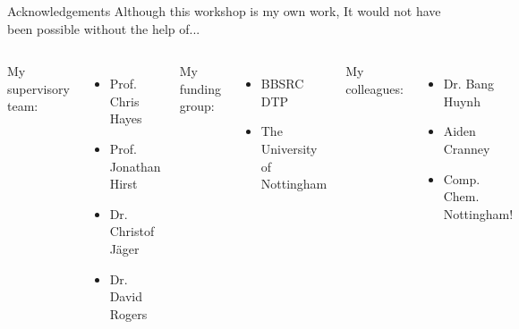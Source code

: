 \begin{frame}{Acknowledgements}
Although this workshop is my own work, It would not have been possible without the help of...
\newline
\begin{columns}
My supervisory team:
\begin{itemize}
\item Prof. Chris Hayes
\item Prof. Jonathan Hirst
\item Dr. Christof J\"{a}ger
\item Dr. David Rogers
\end{itemize}

My funding group:
\begin{itemize}
\item BBSRC DTP
\item The University of Nottingham
\end{itemize}

My colleagues:
\begin{itemize}
\item Dr. Bang Huynh
\item Aiden Cranney
\item Comp. Chem. Nottingham! 
\end{itemize}
\begin{multicols}{2}
\centering
\begin{figure}
\includegraphics[height=0.08\textheight]{../Graphics/UoN_gradient_logo_CMYK}
\end{figure}
\begin{figure}
\includegraphics[height=0.08\textheight]{../Graphics/UKRI_BBSR_Council-Logo_Horiz-CMYK}
\end{figure}
\end{multicols}

\end{columns}
\end{frame}